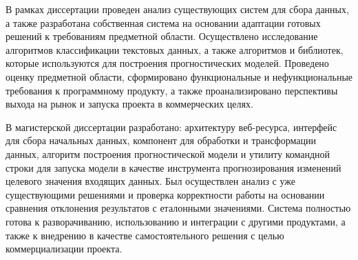 В рамках диссертации проведен анализ существующих систем для сбора данных, а также разработана собственная система на основании адаптации готовых решений к требованиям предметной области. Осуществлено исследование алгоритмов классификации текстовых данных, а также алгоритмов и библиотек, которые используются для построения прогностических моделей. Проведено оценку предметной области, сформировано функциональные и нефункциональные требования к программному продукту, а также проанализировано перспективы выхода на рынок и запуска проекта в коммерческих целях.

В магистерской диссертации разработано: архитектуру веб-ресурса, интерфейс для сбора начальных данных, компонент для обработки и трансформации данных, алгоритм построения прогностической модели и утилиту командной строки для запуска модели в качестве инструмента прогнозирования изменений целевого значения входящих данных. Был осуществлен анализ с уже существующими решениями и проверка корректности работы на основании сравнения отклонения результатов с еталонными значениями. Система полностью готова к разворачиванию, использованию и интеграции с другими продуктами, а также к внедрению в качестве самостоятельного решения с целью коммерциализации проекта.
